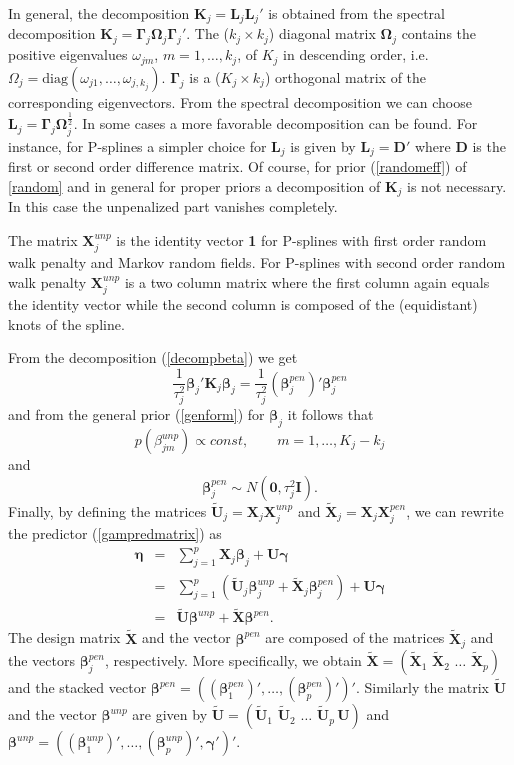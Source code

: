 \documentclass[11pt,a4paper,twoside]{bayesxarticle}
\newcommand{\diag}{\mbox{diag}}
\def \Kvec {\vec{K}}
\def \betavec {\boldsymbol{\beta}}
\def \etavec {\boldsymbol{\eta}}
\def \gammavec {\boldsymbol{\gamma}}
\def \Gammavec {\boldsymbol{\Gamma}}
\def \Omegavec {\boldsymbol{\Omega}}
\def \Dvec {\mathbf{D}}
\def \Kvec {\mathbf{K}}
\def \Ivec {\mathbf{I}}
\def \Lvec {\mathbf{L}}
\def \Uvec {\mathbf{U}}
\def \Xvec {\mathbf{X}}
\def \nullvec {\boldsymbol{0}}
\begin{document}
In general, the decomposition $\Kvec_j=\Lvec_j\Lvec_j'$ is obtained from the
spectral decomposition $\Kvec_j = \Gammavec_j \Omegavec_j \Gammavec_j'$. The
($k_j \times k_j$)  diagonal matrix $\Omegavec_j$ contains the positive
eigenvalues $\omega_{jm}$, $m=1,\dots,k_j$, of $K_j$ in descending
order, i.e. $\Omega_j = \diag(\omega_{j1},\dots,\omega_{j,k_j})$.
$\Gammavec_j$ is a ($K_j \times k_j$) orthogonal matrix of the
corresponding eigenvectors. From the spectral decomposition we can
choose $\Lvec_j = \Gammavec_j \Omegavec_j^{\frac{1}{2}}$. In some cases a more
favorable decomposition can be found. For instance, for P-splines a
simpler choice for $\Lvec_j$ is given by $\Lvec_j = \Dvec'$ where $\Dvec$ is the
first or second order difference matrix. Of course, for  prior
(\ref{randomeff}) of \autoref{random} and in general for proper
priors a decomposition of $\Kvec_j$ is not necessary. In this case the
unpenalized part vanishes completely.

The matrix $\Xvec_j^{unp}$ is the identity vector {\bf 1} for P-splines
with first order random walk penalty and Markov random fields. For
P-splines with second order random walk penalty $\Xvec_j^{unp}$ is a two
column matrix where the first column again equals the identity
vector while the second column is composed of the (equidistant)
knots of the spline.

From the decomposition (\ref{decompbeta}) we get
$$
\frac{1}{\tau^2_j} \betavec_j' \Kvec_j \betavec_j = \frac{1}{\tau^2_j}
(\betavec_j^{pen})' \betavec_j^{pen}
$$
and from the general prior (\ref{genform}) for $\betavec_j$ it follows
that
$$
p(\beta_{jm}^{unp}) \propto const , \qquad m=1,\dots, K_j-k_j
$$
and
\begin{equation}
\label{priorunp} \betavec_j^{pen} \sim N(\nullvec,\tau_j^2 \Ivec).
\end{equation}
Finally, by defining the matrices $\tilde{\Uvec}_j = \Xvec_j \Xvec_j^{unp}$
and $\tilde{\Xvec}_j = \Xvec_j \Xvec_j^{pen}$, we can rewrite the predictor
(\ref{gampredmatrix}) as
\begin{eqnarray*}
\etavec &=& \sum_{j=1}^{p} \Xvec_j \betavec_j  + \Uvec \gammavec\\
     &=& \displaystyle \sum_{j=1}^{p}  (\tilde{\Uvec}_j \betavec_j^{unp} + \tilde{\Xvec}_j
     \betavec_j^{pen}) +  \Uvec \gammavec\\
&=& \displaystyle \tilde{\Uvec} \betavec^{unp} + \tilde{\Xvec} \betavec^{pen}.
\end{eqnarray*}
The design matrix $\tilde{\Xvec}$ and the vector $\betavec^{pen}$ are
composed of the matrices $\tilde{\Xvec}_j$ and the vectors
$\betavec_j^{pen}$, respectively. More specifically, we obtain
$\tilde{\Xvec} = (\tilde{\Xvec}_1 \,\, \tilde{\Xvec}_2 \,\, \ldots \,\,
\tilde{\Xvec}_p) $ and the stacked vector $\betavec^{pen} =
((\betavec_1^{pen})',\dots,(\betavec_p^{pen})')'$. Similarly the matrix
$\tilde{\Uvec}$ and the vector $\betavec^{unp}$ are given by $\tilde{\Uvec} =
(\tilde{\Uvec}_1 \,\, \tilde{\Uvec}_2 \,\, \ldots \,\, \tilde{\Uvec}_p \, \Uvec)$
and $\betavec^{unp} =
((\betavec_1^{unp})',\dots,(\betavec_p^{unp})',\gammavec')'$.
\end{document}
